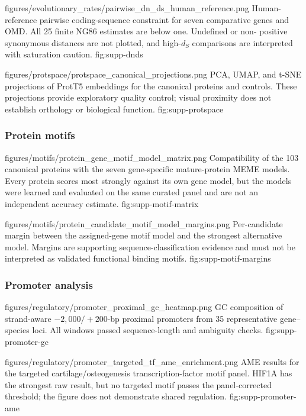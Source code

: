 \thesissuppfigure
{figures/evolutionary_rates/pairwise_dn_ds_human_reference.png}
{Human-reference pairwise coding-sequence constraint for seven comparative
genes and OMD. All 25 finite NG86 estimates are below one. Undefined or non-
positive synonymous distances are not plotted, and high-$d_S$ comparisons are
interpreted with saturation caution.}
{fig:supp-dnds}

\thesissuppfigure
{figures/protspace/protspace_canonical_projections.png}
{PCA, UMAP, and t-SNE projections of ProtT5 embeddings for the canonical
proteins and controls. These projections provide exploratory quality control;
visual proximity does not establish orthology or biological function.}
{fig:supp-protspace}

\clearpage
\subsubsection{Protein motifs}

\thesissuppfigure
{figures/motifs/protein_gene_motif_model_matrix.png}
{Compatibility of the 103 canonical proteins with the seven gene-specific
mature-protein MEME models. Every protein scores most strongly against its own
gene model, but the models were learned and evaluated on the same curated panel
and are not an independent accuracy estimate.}
{fig:supp-motif-matrix}

\thesissuppfigure
{figures/motifs/protein_candidate_motif_model_margins.png}
{Per-candidate margin between the assigned-gene motif model and the strongest
alternative model. Margins are supporting sequence-classification evidence and
must not be interpreted as validated functional binding motifs.}
{fig:supp-motif-margins}

\clearpage
\subsubsection{Promoter analysis}

\thesissuppfigure
{figures/regulatory/promoter_proximal_gc_heatmap.png}
{GC composition of strand-aware $-2{,}000/+200$-bp proximal promoters from 35
representative gene--species loci. All windows passed sequence-length and
ambiguity checks.}
{fig:supp-promoter-gc}

\thesissuppfigure
{figures/regulatory/promoter_targeted_tf_ame_enrichment.png}
{AME results for the targeted cartilage/osteogenesis transcription-factor
motif panel. HIF1A has the strongest raw result, but no targeted motif passes
the panel-corrected threshold; the figure does not demonstrate shared
regulation.}
{fig:supp-promoter-ame}

